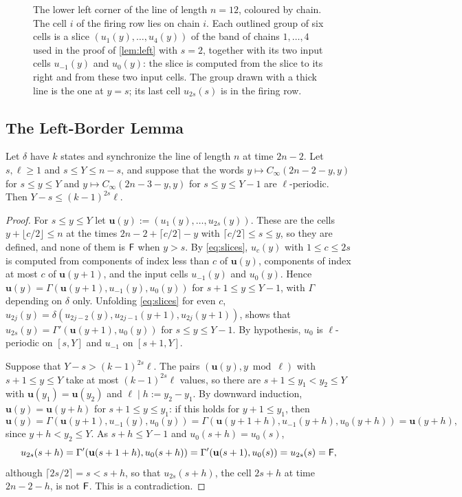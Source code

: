 \begin{figure}[t]
\centering

\caption{The lower left corner of the line of length $n=12$, coloured by
chain. The cell $i$ of the firing row lies on chain $i$. Each outlined group of
six cells is a slice $(u_1(y),\dots,u_4(y))$ of the band of chains
$1,\dots,4$ used in the proof of \cref{lem:left} with $s=2$, together with its
two input cells $u_{-1}(y)$ and $u_0(y)$: the slice is computed from the slice
to its right and from these two input cells. The group drawn with a thick line
is the one at $y=s$; its last cell $u_{2s}(s)$ is in the firing row.}
\label{fig:chains}
\end{figure}

\subsection{The Left-Border Lemma}

\begin{lemma}\label{lem:left}
Let $\delta$ have $k$ states and synchronize the line of length $n$ at time
$2n-2$. Let $s,\ell\ge1$ and $s\le Y\le n-s$, and suppose that the words
$y\mapsto C_\infty(2n-2-y,y)$ for $s\le y\le Y$ and $y\mapsto
C_\infty(2n-3-y,y)$ for $s\le y\le Y-1$ are $\ell$-periodic. Then
$Y-s\le(k-1)^{2s}\ell$.
\end{lemma}

\begin{proof}
For $s\le y\le Y$ let $\mathbf u(y):=(u_1(y),\dots,u_{2s}(y))$. These are the
cells $y+\lfloor c/2\rfloor\le n$ at the times $2n-2+\lceil c/2\rceil-y$ with
$\lceil c/2\rceil\le s\le y$, so they are defined, and none of them is $\mathsf F$ when
$y>s$. By \eqref{eq:slices}, $u_c(y)$ with $1\le c\le 2s$ is computed from
components of index less than $c$ of $\mathbf u(y)$, components of index at
most $c$ of $\mathbf u(y+1)$, and the input cells $u_{-1}(y)$ and $u_0(y)$.
Hence $\mathbf u(y)=\Gamma(\mathbf u(y+1),u_{-1}(y),u_0(y))$ for $s+1\le y\le
Y-1$, with $\Gamma$ depending on $\delta$ only. Unfolding \eqref{eq:slices} for
even $c$, $u_{2j}(y)=\delta(u_{2j-2}(y),u_{2j-1}(y+1),u_{2j}(y+1))$, shows that
$u_{2s}(y)=\Gamma'(\mathbf u(y+1),u_0(y))$ for $s\le y\le Y-1$. By hypothesis,
$u_0$ is $\ell$-periodic on $[s,Y]$ and $u_{-1}$ on $[s+1,Y]$.

Suppose that $Y-s>(k-1)^{2s}\ell$. The pairs $(\mathbf u(y),y\bmod\ell)$ with
$s+1\le y\le Y$ take at most $(k-1)^{2s}\ell$ values, so there are $s+1\le
y_1<y_2\le Y$ with $\mathbf u(y_1)=\mathbf u(y_2)$ and $\ell\mid h:=y_2-y_1$.
By downward induction, $\mathbf u(y)=\mathbf u(y+h)$ for $s+1\le y\le y_1$: if
this holds for $y+1\le y_1$, then
\[
\mathbf u(y)=\Gamma(\mathbf u(y+1),u_{-1}(y),u_0(y))
=\Gamma(\mathbf u(y+1+h),u_{-1}(y+h),u_0(y+h))=\mathbf u(y+h),
\]
since $y+h<y_2\le Y$. As $s+h\le Y-1$ and $u_0(s+h)=u_0(s)$,
\[
u_{2s}(s+h)=\Gamma'(\mathbf u(s+1+h),u_0(s+h))=\Gamma'(\mathbf
u(s+1),u_0(s))=u_{2s}(s)=\mathsf F,
\]
although $\lceil 2s/2\rceil=s<s+h$, so that $u_{2s}(s+h)$, the cell $2s+h$ at
time $2n-2-h$, is not $\mathsf F$. This is a contradiction.
\end{proof}

